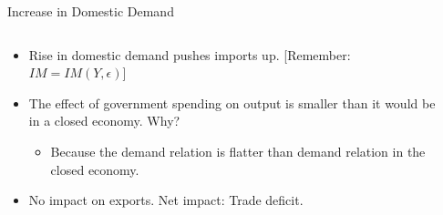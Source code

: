 \documentclass[shownotes,11pt, aspectratio=169]{beamer}
\begin{document}
\begin{frame}{Increase in Domestic Demand}
\begin{columns}[T] %
\begin{column}{.36\textwidth}
\begin{itemize}
\item Rise in domestic demand pushes imports up. [Remember: $IM = IM(Y, \epsilon)$]
\item The effect of government spending on output is smaller than it would be in a closed economy. Why? \pause
      \begin{itemize}
      \item Because the demand relation is flatter than demand relation in the closed economy.
      \end{itemize}
\item No impact on exports. \pause Net impact: Trade deficit.
\end{itemize}
\end{column}
\hfill
\pause
\begin{column}{.54\textwidth}
\end{column}
\end{columns}
\end{frame}
\end{document}
